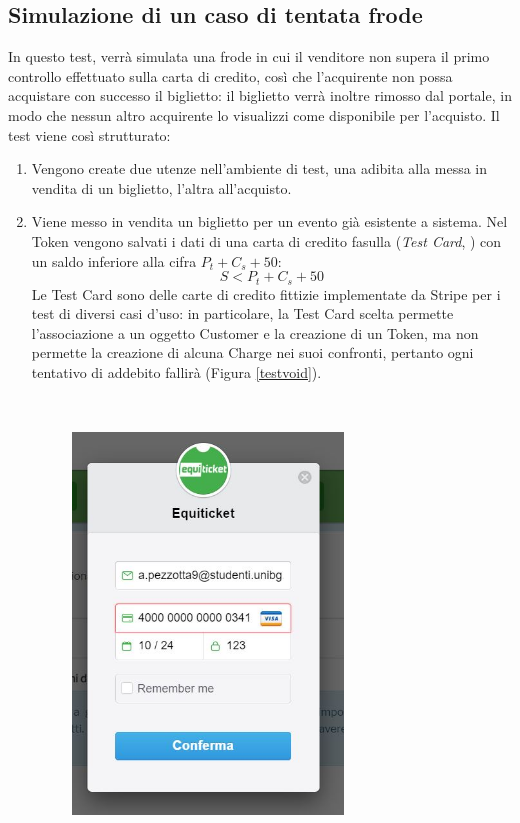 \subsection{Simulazione di un caso di tentata frode}
In questo test, verrà simulata una frode in cui il venditore non supera il primo controllo effettuato sulla carta di credito, così che l'acquirente non possa acquistare con successo il biglietto: il biglietto verrà inoltre rimosso dal portale, in modo che nessun altro acquirente lo visualizzi come disponibile per l'acquisto. 
Il test viene così strutturato: 
\begin{enumerate}
\item Vengono create due utenze nell'ambiente di test, una adibita alla messa in vendita di un biglietto, l'altra all'acquisto. 
\item Viene messo in vendita un biglietto per un evento già esistente a sistema. Nel Token vengono salvati i dati di una carta di credito fasulla (\textit{Test Card}, \cite{stripedoc}) con un saldo inferiore alla cifra $P_{t} + C_{s} + 50$: 
\begin{equation}
S < P_{t} + C_{s} + 50
\end{equation}
Le Test Card sono delle carte di credito fittizie implementate da Stripe per i test di diversi casi d'uso: in particolare, la Test Card scelta permette l'associazione a un oggetto Customer e la creazione di un Token, ma non permette la creazione di alcuna Charge nei suoi confronti, pertanto ogni tentativo di addebito fallirà \cite{stripedoc} (Figura \ref{testvoid}).
\begin{figure}[htbp]
	\centering
	\includegraphics[width=0.68\textwidth, height=12cm]{chapter4/immagini/test2_cartavuota}

\end{figure}
\end{enumerate}
